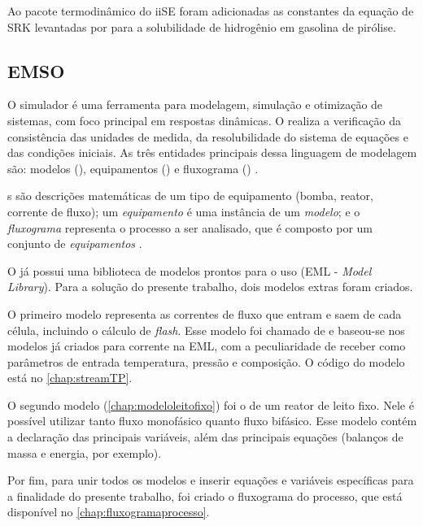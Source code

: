 Ao pacote termodinâmico do iiSE foram adicionadas as constantes da equação de
SRK levantadas por  para a solubilidade de hidrogênio em
gasolina de pirólise.

\subsection{EMSO} \label{sec:EMSO}

O simulador \emso{} é uma ferramenta para modelagem, simulação e otimização de
sistemas, com foco principal em respostas dinâmicas. O \emso{} realiza a
verificação da consistência das unidades de medida, da resolubilidade do sistema
de equações e das condições iniciais. As três entidades principais dessa
linguagem de modelagem são: modelos (), equipamentos
() e fluxograma () \cite{Soares2003}.

s são descrições matemáticas de um tipo de equipamento (bomba,
reator, corrente de fluxo); um \textit{equipamento} é uma instância de um
\textit{modelo}; e o \textit{fluxograma} representa o processo a ser analisado,
que é composto por um conjunto de \textit{equipamentos} \cite{Soares2003}.

O \emso{} já possui uma biblioteca de modelos prontos para o uso (EML -
\emph{\emso{} Model Library}). Para a solução do presente trabalho, dois modelos
extras foram criados.

O primeiro modelo representa as correntes de fluxo que entram e saem de
cada célula, incluindo o cálculo de \emph{flash}. Esse modelo foi chamado de
 e baseou-se nos modelos já criados para corrente na EML, com
a peculiaridade de receber como parâmetros de entrada temperatura, pressão e
composição. O código do modelo  está no
\autoref{chap:streamTP}.

O segundo modelo (\autoref{chap:modeloleitofixo}) foi o de um reator de leito
fixo. Nele é possível utilizar tanto fluxo monofásico quanto fluxo bifásico.
Esse modelo contém a declaração das principais variáveis, além das principais
equações (balanços de massa e energia, por exemplo).

Por fim, para unir todos os modelos e inserir equações e variáveis
específicas para a finalidade do presente trabalho, foi criado o fluxograma do
processo, que está disponível no \autoref{chap:fluxogramaprocesso}.


